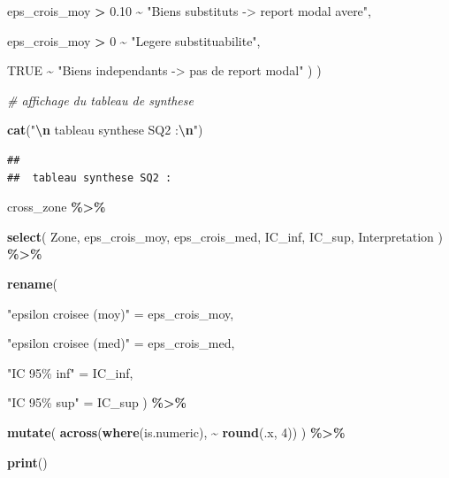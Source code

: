 \documentclass[
]{article}
\newenvironment{Shaded}{\begin{snugshade}}{\end{snugshade}}
\newcommand{\CommentTok}[1]{\textcolor[rgb]{0.56,0.35,0.01}{\textit{#1}}}
\newcommand{\ConstantTok}[1]{\textcolor[rgb]{0.56,0.35,0.01}{#1}}
\newcommand{\DecValTok}[1]{\textcolor[rgb]{0.00,0.00,0.81}{#1}}
\newcommand{\FloatTok}[1]{\textcolor[rgb]{0.00,0.00,0.81}{#1}}
\newcommand{\FunctionTok}[1]{\textcolor[rgb]{0.13,0.29,0.53}{\textbf{#1}}}
\newcommand{\NormalTok}[1]{#1}
\newcommand{\OtherTok}[1]{\textcolor[rgb]{0.56,0.35,0.01}{#1}}
\newcommand{\SpecialCharTok}[1]{\textcolor[rgb]{0.81,0.36,0.00}{\textbf{#1}}}
\newcommand{\StringTok}[1]{\textcolor[rgb]{0.31,0.60,0.02}{#1}}
\begin{document}
\begin{Shaded}
\begin{Highlighting}[]
\NormalTok{      eps\_crois\_moy }\SpecialCharTok{\textgreater{}} \FloatTok{0.10} \SpecialCharTok{\textasciitilde{}}
        \StringTok{"Biens substituts {-}\textgreater{} report modal avere"}\NormalTok{,}

\NormalTok{      eps\_crois\_moy }\SpecialCharTok{\textgreater{}} \DecValTok{0} \SpecialCharTok{\textasciitilde{}}
        \StringTok{"Legere substituabilite"}\NormalTok{,}

      \ConstantTok{TRUE} \SpecialCharTok{\textasciitilde{}}
        \StringTok{"Biens independants {-}\textgreater{} pas de report modal"}
\NormalTok{    )}
\NormalTok{  )}


\CommentTok{\# affichage du tableau de synthese}

\FunctionTok{cat}\NormalTok{(}\StringTok{"}\SpecialCharTok{\textbackslash{}n}\StringTok{ tableau synthese SQ2 :}\SpecialCharTok{\textbackslash{}n}\StringTok{"}\NormalTok{)}
\end{Highlighting}
\end{Shaded}

\begin{verbatim}
## 
##  tableau synthese SQ2 :
\end{verbatim}

\begin{Shaded}
\begin{Highlighting}[]
\NormalTok{cross\_zone }\SpecialCharTok{\%\textgreater{}\%}

  \FunctionTok{select}\NormalTok{(}
\NormalTok{    Zone,}
\NormalTok{    eps\_crois\_moy,}
\NormalTok{    eps\_crois\_med,}
\NormalTok{    IC\_inf,}
\NormalTok{    IC\_sup,}
\NormalTok{    Interpretation}
\NormalTok{  ) }\SpecialCharTok{\%\textgreater{}\%}

  \FunctionTok{rename}\NormalTok{(}

    \StringTok{"epsilon croisee (moy)"} \OtherTok{=}\NormalTok{ eps\_crois\_moy,}

    \StringTok{"epsilon croisee (med)"} \OtherTok{=}\NormalTok{ eps\_crois\_med,}

    \StringTok{"IC 95\% inf"} \OtherTok{=}\NormalTok{ IC\_inf,}

    \StringTok{"IC 95\% sup"} \OtherTok{=}\NormalTok{ IC\_sup}
\NormalTok{  ) }\SpecialCharTok{\%\textgreater{}\%}

  \FunctionTok{mutate}\NormalTok{(}
    \FunctionTok{across}\NormalTok{(}\FunctionTok{where}\NormalTok{(is.numeric), }\SpecialCharTok{\textasciitilde{}} \FunctionTok{round}\NormalTok{(.x, }\DecValTok{4}\NormalTok{))}
\NormalTok{  ) }\SpecialCharTok{\%\textgreater{}\%}

  \FunctionTok{print}\NormalTok{()}
\end{Highlighting}
\end{Shaded}
\end{document}
